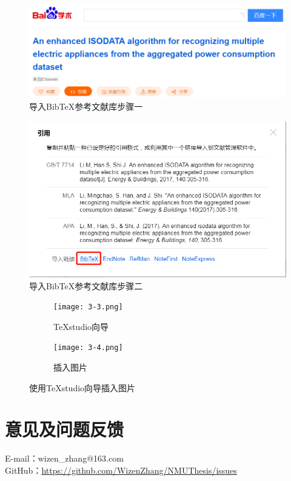 \begin{figure}[tbh!]
	\centering
	\includegraphics[width=0.6\linewidth]{figures/sample/3-1}
	\caption{导入BibTeX参考文献库步骤一}
	\label{fig:3-1}
\end{figure}

\begin{figure}[tbh!]
	\centering
	\includegraphics[width=0.6\linewidth]{figures/sample/3-2}
	\caption{导入BibTeX参考文献库步骤二}
	\label{fig:3-2}
\end{figure}

\begin{figure}[htb!]
	\centering
	\begin{subfigure}[b]{.4\textwidth}
		\centering
		\texttt{[image: 3-3.png]}
		\caption{TeXstudio向导}\label{subfig:3a}
	\end{subfigure}
	\begin{subfigure}[b]{.4\textwidth}
		\centering
		\texttt{[image: 3-4.png]}
		\caption{插入图片}\label{subfig:3b}
	\end{subfigure}
	\caption{使用TeXstudio向导插入图片}\label{fig:3}
\end{figure}
\section{意见及问题反馈}

\indent E-mail：wizen\_zhang@163.com\\
\indent GitHub：\href{https://github.com/WizenZhang/NMUThesis/issues}{https://github.com/WizenZhang/NMUThesis/issues}


